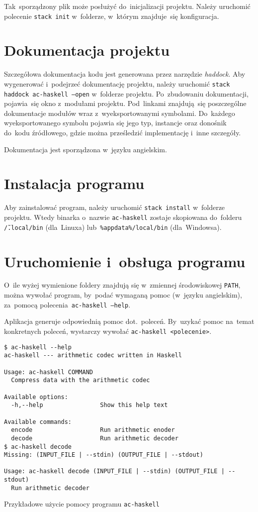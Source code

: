 \documentclass[../../praca.tex]{subfiles}
\begin{document}
Tak~sporządzony plik może posłużyć do~inicjalizacji projektu.
Należy uruchomić polecenie \texttt{stack init} w~folderze,
w~którym znajduje~się konfiguracja.

\section{Dokumentacja projektu}

Szczegółowa dokumentacja kodu jest generowana przez narzędzie \emph{haddock}.
Aby wygenerować i~podejrzeć dokumentację projektu, należy uruchomić \texttt{stack haddock
ac-haskell --open} w~folderze projektu. Po~zbudowaniu dokumentacji, pojawia~się
okno z~modułami projektu. Pod~linkami znajdują~się poszczególne dokumentacje
modułów wraz z~wyeksportowanymi symbolami. Do~każdego wyeksportowanego
symbolu pojawia się jego typ, instancje oraz donośnik do~kodu źródłowego,
gdzie można prześledzić implementację i~inne szczegóły.

Dokumentacja jest sporządzona w~języku angielskim.

\section{Instalacja programu}

Aby zainstalować program, należy uruchomić \texttt{stack install} 
w~folderze projektu. Wtedy binarka o~nazwie \texttt{ac-haskell}
zostaje skopiowana do~folderu \texttt{\~/.local/bin} (dla~Linuxa)
lub~\texttt{\%appdata\%/local/bin} (dla~Windowsa).

\section{Uruchomienie i~obsługa programu}

O~ile wyżej wymienione foldery znajdują się w~zmiennej środowiskowej
\texttt{PATH}, można wywołać program, by~podać wymaganą pomoc (w~języku angielskim),
za~pomocą polecenia~\texttt{ac-haskell --help}.

Aplikacja generuje odpowiednią pomoc dot.~poleceń. By~uzykać pomoc na~temat konkretnych
poleceń, wystarczy wywołać \texttt{ac-haskell <polecenie>}.

\begin{listing}
  \begin{verbatim}
$ ac-haskell --help
ac-haskell --- arithmetic codec written in Haskell

Usage: ac-haskell COMMAND
  Compress data with the arithmetic codec

Available options:
  -h,--help                Show this help text

Available commands:
  encode                   Run arithmetic enoder
  decode                   Run arithmetic decoder
$ ac-haskell decode
Missing: (INPUT_FILE | --stdin) (OUTPUT_FILE | --stdout)

Usage: ac-haskell decode (INPUT_FILE | --stdin) (OUTPUT_FILE | --stdout)
  Run arithmetic decoder
  \end{verbatim}
  \caption{Przykładowe użycie pomocy programu \texttt{ac-haskell}}
\end{listing}
\end{document}
